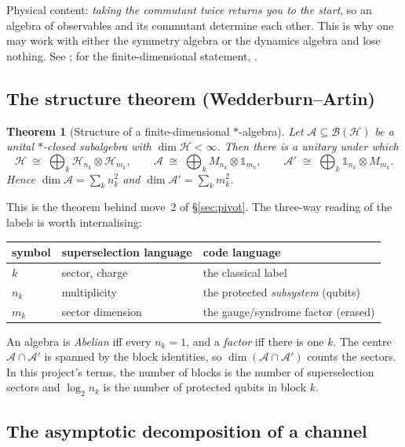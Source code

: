 \documentclass[11pt]{article}
\newcommand{\B}{\mathcal{B}}
\newcommand{\A}{\mathcal{A}}
\newcommand{\HH}{\mathcal{H}}
\theoremstyle{plain}
\newtheorem{theorem}{Theorem}
\theoremstyle{remark}
\begin{document}
\noindent Physical content: \emph{taking the commutant twice returns you to the
start}, so an algebra of observables and its commutant determine each other.
This is why one may work with either the symmetry algebra or the dynamics
algebra and lose nothing. See \cite{BR1, Blackadar2006}; for the
finite-dimensional statement, \cite{Wolf2012, Watrous2018}.

\subsection{The structure theorem (Wedderburn--Artin)}
\label{sec:wedderburn}

\begin{theorem}[Structure of a finite-dimensional $*$-algebra]
\label{thm:structure}
Let $\A \subseteq \B(\HH)$ be a unital $*$-closed subalgebra with
$\dim\HH < \infty$. Then there is a unitary under which
\[
  \HH \;\cong\; \bigoplus_k \HH_{n_k} \otimes \HH_{m_k},
  \qquad
  \A \;\cong\; \bigoplus_k M_{n_k} \otimes \mathbb{1}_{m_k},
  \qquad
  \A' \;\cong\; \bigoplus_k \mathbb{1}_{n_k} \otimes M_{m_k}.
\]
Hence $\dim\A = \sum_k n_k^2$ and $\dim\A' = \sum_k m_k^2$.
\end{theorem}

\noindent This is the theorem behind move~2 of \S\ref{sec:pivot}. The three-way
reading of the labels is worth internalising:

\begin{center}
\begin{tabular}{lll}
\toprule
symbol & superselection language & code language \\
\midrule
$k$    & sector, charge        & the classical label \\
$n_k$  & multiplicity          & the protected \emph{subsystem} (qubits) \\
$m_k$  & sector dimension      & the gauge/syndrome factor (erased) \\
\bottomrule
\end{tabular}
\end{center}

\noindent An algebra is \emph{Abelian} iff every $n_k = 1$, and a \emph{factor}
iff there is one $k$. The centre $\A \cap \A'$ is spanned by the block
identities, so $\dim(\A\cap\A')$ counts the sectors. In this project's terms,
the number of blocks is the number of superselection sectors and $\log_2 n_k$
is the number of protected qubits in block $k$.

\subsection{The asymptotic decomposition of a channel}
\end{document}

